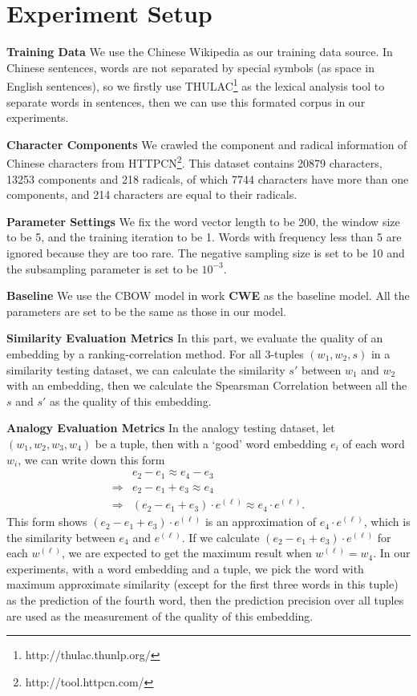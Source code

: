 
\section{Experiment Setup}
\usepackage{amsmath}
\textbf{Training Data} We use the Chinese Wikipedia as our training data source. In Chinese sentences, words are not separated by special symbols (as space in English sentences), so we firstly use THULAC\footnote{http://thulac.thunlp.org/} as the lexical analysis tool to separate words in sentences, then we can use this formated corpus in our experiments.

\textbf{Character Components} We crawled the component and radical information of Chinese characters from HTTPCN\footnote{http://tool.httpcn.com/}. This dataset contains 20879 characters, 13253 components and 218 radicals, of which 7744 characters have more than one components, and 214 characters are equal to their radicals.

\textbf{Parameter Settings} We fix the word vector length to be 200, the window size to be 5, and the training iteration to be 1. Words with frequency less than 5 are ignored because they are too rare. The negative sampling size is set to be 10 and the subsampling parameter is set to be $10^{-3}$.

\textbf{Baseline} We use the CBOW model in work \textbf{CWE} as the baseline model. All the parameters are set to be the same as those in our model.

\textbf{Similarity Evaluation Metrics} In this part, we evaluate the quality of an embedding by a ranking-correlation method. For all 3-tuples $(w_1, w_2, s)$ in a similarity testing dataset, we can calculate the similarity $s'$ between $w_1$ and $w_2$ with an embedding, then we calculate the Spearsman Correlation between all the $s$ and $s'$ as the quality of this embedding.

\textbf{Analogy Evaluation Metrics} In the analogy testing dataset, let $(w_1, w_2, w_3, w_4)$ be a tuple, then with a `good' word embedding $e_i$ of each word $w_i$, we can write down this form
\begin{align*}
	& e_2 - e_1 \approx e_4 - e_3 \\
	\Rightarrow & e_2 - e_1 + e_3 \approx e_4 \\
	\Rightarrow & (e_2 - e_1 + e_3)\cdot e^{(\ell)} \approx e_4\cdot e^{(\ell)}.
\end{align*}
This form shows $(e_2 - e_1 + e_3)\cdot e^{(\ell)}$ is an approximation of $e_4\cdot e^{(\ell)}$, which is the similarity between $e_4$ and $e^{(\ell)}$. If we calculate $(e_2 - e_1 + e_3)\cdot e^{(\ell)}$ for each $w^{(\ell)}$, we are expected to get the maximum result when $w^{(\ell)}=w_4$. In our experiments, with a word embedding and a tuple, we pick the word with maximum approximate similarity (except for the first three words in this tuple) as the prediction of the fourth word, then the prediction precision over all tuples are used as the measurement of the quality of this embedding.

